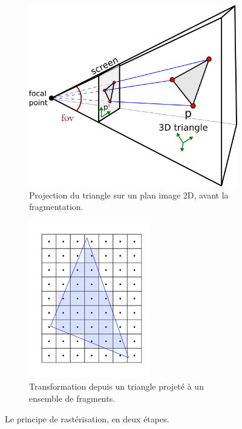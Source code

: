 {{        \begin{figure}
            \centering
            \begin{subfigure}{.48\linewidth}
                \centering
                \includegraphics[width=.8\linewidth]{img/rasterization.png}
                \captionsetup{width=.8\linewidth}
                \caption{Projection du triangle sur un plan image 2D, avant la fragmentation.}
                \label{img:opengl:raster:projection}
            \end{subfigure}
            \begin{subfigure}{.48\linewidth}
                \centering
                \includegraphics[width=.8\linewidth]{img/raster_to_frag.png}
                \captionsetup{width=.8\linewidth}
                \caption{Transformation depuis un triangle projeté à un ensemble de fragments.}
                \label{img:opengl:raster:fragments}
            \end{subfigure}
            \captionsetup{width=.6\linewidth}
            \caption{Le principe de rastérisation, en deux étapes.}
            \label{img:opengl:raster}
        \end{figure}

}}
